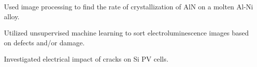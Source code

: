 \documentclass[10pt]{article}
\begin{document}
{    %
	{\begin{newitemize}

		\item Used image processing to find the rate of crystallization of AlN on a molten Al-Ni alloy.
		\item Utilized unsupervised machine learning to sort electroluminescence images based on defects and/or damage.
		\item Investigated electrical impact of cracks on Si PV cells.
	
		\end{newitemize}}
%	
	
}	
		
\end{document}
